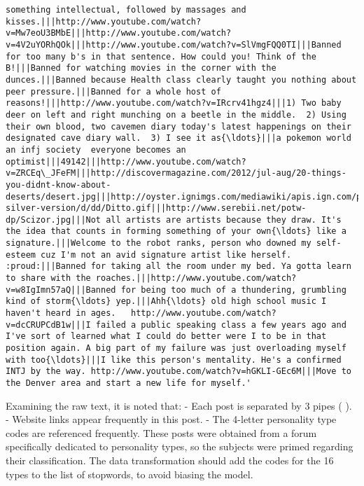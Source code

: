 \documentclass[11pt]{article}
\begin{document}
\begin{Verbatim}[commandchars=\\\{\}]
something intellectual, followed by massages and kisses.|||http://www.youtube.com/watch?v=Mw7eoU3BMbE|||http://www.youtube.com/watch?v=4V2uYORhQOk|||http://www.youtube.com/watch?v=SlVmgFQQ0TI|||Banned for too many b's in that sentence. How could you! Think of the B!|||Banned for watching movies in the corner with the dunces.|||Banned because Health class clearly taught you nothing about peer pressure.|||Banned for a whole host of reasons!|||http://www.youtube.com/watch?v=IRcrv41hgz4|||1) Two baby deer on left and right munching on a beetle in the middle.  2) Using their own blood, two cavemen diary today's latest happenings on their designated cave diary wall.  3) I see it as{\ldots}|||a pokemon world  an infj society  everyone becomes an optimist|||49142|||http://www.youtube.com/watch?v=ZRCEq\_JFeFM|||http://discovermagazine.com/2012/jul-aug/20-things-you-didnt-know-about-deserts/desert.jpg|||http://oyster.ignimgs.com/mediawiki/apis.ign.com/pokemon-silver-version/d/dd/Ditto.gif|||http://www.serebii.net/potw-dp/Scizor.jpg|||Not all artists are artists because they draw. It's the idea that counts in forming something of your own{\ldots} like a signature.|||Welcome to the robot ranks, person who downed my self-esteem cuz I'm not an avid signature artist like herself. :proud:|||Banned for taking all the room under my bed. Ya gotta learn to share with the roaches.|||http://www.youtube.com/watch?v=w8IgImn57aQ|||Banned for being too much of a thundering, grumbling kind of storm{\ldots} yep.|||Ahh{\ldots} old high school music I haven't heard in ages.   http://www.youtube.com/watch?v=dcCRUPCdB1w|||I failed a public speaking class a few years ago and I've sort of learned what I could do better were I to be in that position again. A big part of my failure was just overloading myself with too{\ldots}|||I like this person's mentality. He's a confirmed INTJ by the way. http://www.youtube.com/watch?v=hGKLI-GEc6M|||Move to the Denver area and start a new life for myself.'

    \end{Verbatim}

    Examining the raw text, it is noted that: - Each post is separated by 3
pipes ( \textbar{}\textbar{}\textbar{} ). - Website links appear
frequently in this post. - The 4-letter personality type codes are
referenced frequently. These posts were obtained from a forum
specifically dedicated to personality types, so the subjects were primed
regarding their classification. The data transformation should add the
codes for the 16 types to the list of stopwords, to avoid biasing the
model.
\end{document}
